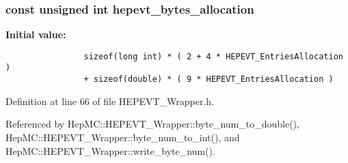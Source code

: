 \subsubsection{\setlength{\rightskip}{0pt plus 5cm}const unsigned int {\bf hepevt\_\-bytes\_\-allocation}}\label{HEPEVT__Wrapper_8h_4e12ee237a5bac41f3131fcda8a5c93b}


\textbf{Initial value:}

\begin{Code}\begin{verbatim} 
                sizeof(long int) * ( 2 + 4 * HEPEVT_EntriesAllocation )
                + sizeof(double) * ( 9 * HEPEVT_EntriesAllocation )
\end{verbatim}
\end{Code}


Definition at line 66 of file HEPEVT\_\-Wrapper.h.

Referenced by Hep\-MC::HEPEVT\_\-Wrapper::byte\_\-num\_\-to\_\-double(), Hep\-MC::HEPEVT\_\-Wrapper::byte\_\-num\_\-to\_\-int(), and Hep\-MC::HEPEVT\_\-Wrapper::write\_\-byte\_\-num().